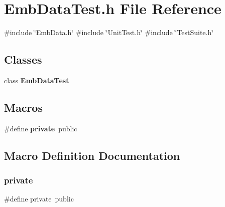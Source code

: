 \section{Emb\+Data\+Test.\+h File Reference}
\label{EmbDataTest_8h}
{\ttfamily \#include \char`\"{}Emb\+Data.\+h\char`\"{}}\newline
{\ttfamily \#include \char`\"{}Unit\+Test.\+h\char`\"{}}\newline
{\ttfamily \#include \char`\"{}Test\+Suite.\+h\char`\"{}}\newline
\subsection*{Classes}
\begin{DoxyCompactItemize}
\item 
class \textbf{ Emb\+Data\+Test}
\end{DoxyCompactItemize}
\subsection*{Macros}
\begin{DoxyCompactItemize}
\item 
\#define \textbf{ private}~public
\end{DoxyCompactItemize}


\subsection{Macro Definition Documentation}
\mbox{\label{EmbDataTest_8h_a6a1d6e1a12975a4e9a0b5b952e79eaad}} 
\subsubsection{private}
{\footnotesize\ttfamily \#define private~public}

